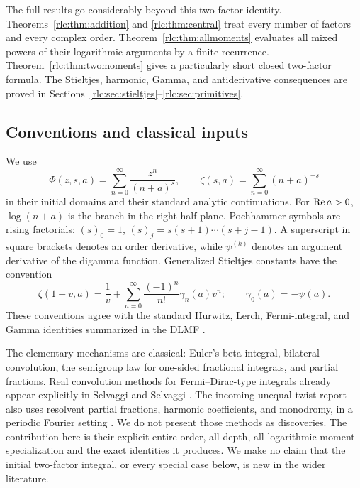The full results go considerably beyond this two-factor identity.
Theorems~\ref{rlc:thm:addition} and \ref{rlc:thm:central} treat every
number of factors and every complex order. Theorem~\ref{rlc:thm:allmoments}
evaluates all mixed powers of their logarithmic arguments by a finite
recurrence. Theorem~\ref{rlc:thm:twomoments} gives a particularly short
closed two-factor formula. The Stieltjes, harmonic, Gamma, and
antiderivative consequences are proved in
Sections~\ref{rlc:sec:stieltjes}--\ref{rlc:sec:primitives}.

\subsection{Conventions and classical inputs}
We use
\[
 \Phi(z,s,a)=\sum_{n=0}^\infty\frac{z^n}{(n+a)^s},\qquad
 \zeta(s,a)=\sum_{n=0}^\infty(n+a)^{-s}
\]
in their initial domains and their standard analytic continuations.
For $\operatorname{Re} a>0$, $\log(n+a)$ is the branch in the right half-plane.
Pochhammer symbols are rising factorials:
$(s)_0=1$, $(s)_j=s(s+1)\cdots(s+j-1)$.
A superscript in square brackets denotes an order derivative, while
$\psi^{(k)}$ denotes an argument derivative of the digamma function.
Generalized Stieltjes constants have the convention
\begin{equation}\label{rlc:eq:stieltjesconvention}
 \zeta(1+v,a)=\frac1v+
 \sum_{n=0}^\infty\frac{(-1)^n}{n!}\gamma_n(a)v^n;
 \qquad \gamma_0(a)=-\psi(a).
\end{equation}
These conventions agree with the standard Hurwitz, Lerch, Fermi-integral,
and Gamma identities summarized in the DLMF \cite{DLMF}.

The elementary mechanisms are classical: Euler's beta integral,
bilateral convolution, the semigroup law for one-sided fractional
integrals, and partial fractions. Real convolution methods for
Fermi--Dirac-type integrals already appear explicitly in
Selvaggi and Selvaggi \cite{Selvaggi}. The incoming unequal-twist report
also uses resolvent partial fractions, harmonic coefficients, and
monodromy, in a periodic Fourier setting \cite{UTJ}.
We do not present those methods as discoveries. The contribution here
is their explicit entire-order, all-depth, all-logarithmic-moment
specialization and the exact identities it produces. We make no claim
that the initial two-factor integral, or every special case below, is
new in the wider literature.

